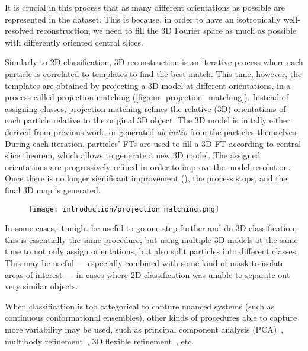 It is crucial in this process that as many different orientations as possible are represented in the dataset.
This is because, in order to have an isotropically well-resolved reconstruction, we need to fill the 3D Fourier space as much as possible with differently oriented central slices.

Similarly to 2D classification, 3D reconstruction is an iterative process where each particle is correlated to templates to find the best match.
This time, however, the templates are obtained by projecting a 3D model at different orientations, in a process called projection matching (\autoref{fig:em_projection_matching}).
Instead of assigning classes, projection matching refines the relative (3D) orientations of each particle relative to the original 3D object.
The 3D model is initally either derived from previous work, or generated \textit{ab initio} from the particles themselves.
During each iteration, particles' FTs are used to fill a 3D FT according to central slice theorem, which allows to generate a new 3D model.
The assigned orientations are progressively refined in order to improve the model resolution.
Once there is no longer significant improvement (), the process stops, and the final 3D map is generated.

\begin{figure}[ht]
    \centering
    \texttt{[image: introduction/projection\_matching.png]}
    \label{fig:em_projection_matching}
\end{figure}

In some cases, it might be useful to go one step further and do 3D classification; this is essentially the same procedure, but using multiple 3D models at the same time to not only assign orientations, but also split particles into different classes.
This may be useful --- especially combined with some kind of mask to isolate areas of interest --- in cases where 2D classification was unable to separate out very similar objects.

When classification is too categorical to capture nuanced systems (such as continuous conformational ensembles), other kinds of procedures able to capture more variability may be used, such as principal component analysis (PCA)~\cite{castano-diezDynamoFlexibleUserfriendly2012,punjani3DVariabilityAnalysis2021}, multibody refinement~\cite{nakaneMultibodyRefinementCryoEM2021}, 3D flexible refinement~\cite{punjani3DFlexibleRefinement2022}, etc.

